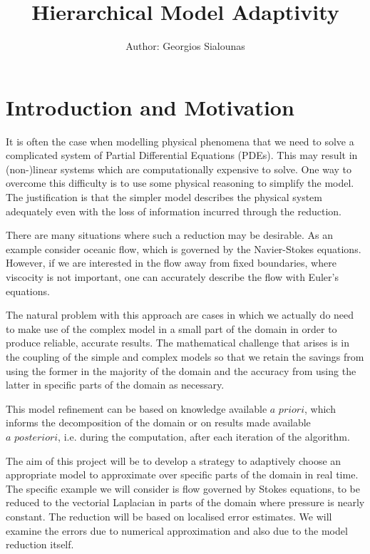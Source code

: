 \documentclass[12pt,a4paper]{article}
\title{Hierarchical Model Adaptivity}
\author{Author: Georgios Sialounas}
\theoremstyle{definition}
\begin{document}
\maketitle
\thispagestyle{empty}
\newpage
\tableofcontents
\thispagestyle{empty}
\newpage
\setcounter{page}{1}


\section{Introduction and Motivation}

It is often the case when modelling physical phenomena that we need to solve a complicated system of Partial Differential Equations (PDEs).  This may result in (non-)linear systems which are computationally expensive to solve.  One way to overcome this difficulty is to use some physical reasoning to simplify the model.  The justification is that the simpler model describes the physical system adequately even with the loss of information incurred through the reduction.  

There are many situations where such a reduction may be desirable.  As an example consider oceanic flow, which is governed by the Navier-Stokes equations.  However, if we are interested in the flow away from fixed boundaries, where viscocity is not important, one can accurately describe the flow with  Euler's equations.

The natural problem with this approach are cases in which we actually do need to make use of the complex model in a small part of the domain in order to produce reliable, accurate results.   The mathematical challenge that arises is in the coupling of the simple and complex models so that we retain the savings from using the former in the majority of the domain and the accuracy from using the latter in specific parts of the domain as necessary.

This model refinement can be based on knowledge available $\textit{a priori}$, which informs the decomposition of the domain or on results made available $\textit{a posteriori}$, i.e. during the computation, after each iteration of the algorithm.

The aim of this project will be to develop a strategy to adaptively choose an appropriate model to approximate over specific parts of the domain in real time.  The specific example we will consider is flow governed by Stokes equations, to be reduced to the vectorial Laplacian in parts of the domain where pressure is nearly constant.  The reduction will be based on localised error estimates.  We will examine the errors due to numerical approximation and also due to the model reduction itself.
\end{document}
